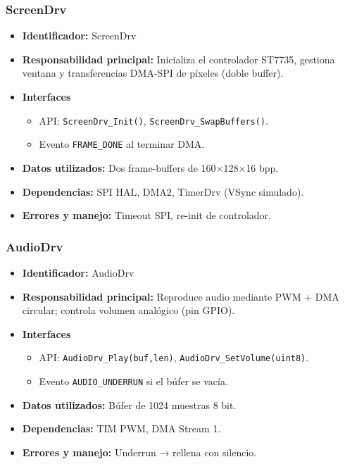 \documentclass[11pt,a4paper]{article}
\begin{document}
\subsubsection{ScreenDrv}
\begin{itemize}
  \item \textbf{Identificador:} ScreenDrv
  \item \textbf{Responsabilidad principal:} Inicializa el controlador ST7735, gestiona ventana y transferencias DMA-SPI de píxeles (doble buffer).
  \item \textbf{Interfaces}
    \begin{itemize}
      \item API: \texttt{ScreenDrv\_Init()}, \texttt{ScreenDrv\_SwapBuffers()}.
      \item Evento \texttt{FRAME\_DONE} al terminar DMA.
    \end{itemize}
  \item \textbf{Datos utilizados:} Dos frame-buffers de 160×128×16 bpp.
  \item \textbf{Dependencias:} SPI HAL, DMA2, TimerDrv (VSync simulado).
  \item \textbf{Errores y manejo:} Timeout SPI, re-init de controlador.
\end{itemize}

\subsubsection{AudioDrv}
\begin{itemize}
  \item \textbf{Identificador:} AudioDrv
  \item \textbf{Responsabilidad principal:} Reproduce audio mediante PWM + DMA circular; controla volumen analógico (pin GPIO).
  \item \textbf{Interfaces} 
    \begin{itemize}
      \item API: \texttt{AudioDrv\_Play(buf,len)}, \texttt{AudioDrv\_SetVolume(uint8)}.
      \item Evento \texttt{AUDIO\_UNDERRUN} si el búfer se vacía.
    \end{itemize}
  \item \textbf{Datos utilizados:} Búfer de 1024 muestras 8 bit.
  \item \textbf{Dependencias:} TIM PWM, DMA Stream 1.
  \item \textbf{Errores y manejo:} Underrun → rellena con silencio.
\end{itemize}
\end{document}
